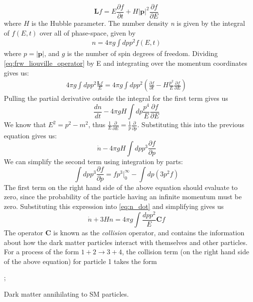 \begin{equation}\label{eq:frw_liouville_operator}
  \mathbf{L}f = E\frac{\partial f}{\partial t} + H|\mathbf{p}|^2 \frac{\partial f}{\partial E}
\end{equation}
where $H$ is the Hubble parameter. The number density \emph{n} is given by the integral of $f(E,t)$ over all of phase-space, given by
\begin{align}
  n = 4\pi g\int dp p^2 f(E,t)
\end{align}
where $p = |\mathbf{p}|$, and $g$ is the number of spin degrees of freedom.
Dividing \autoref{eq:frw_liouville_operator} by E and integrating over the momentum coordinates gives us:
\begin{align}
  4\pi g\int dp p^2 \frac{\mathbf{L}f}{E} = 4\pi g\int dp p^2 \left(\frac{\partial f}{\partial t}- H\frac{p^2}{E}\frac{\partial f}{\partial E}\right)
\end{align}
Pulling the partial derivative outside the integral for the first term gives us
\begin{equation}
  \frac{dn}{dt} - 4\pi gH\int dp\frac{p^4}{E}\frac{\partial f}{\partial E}
\end{equation}
We know that $E^2 = p^2 - m^2$, thus $\frac{1}{E}\frac{\partial}{\partial E} = \frac{1}{p}\frac{\partial}{\partial p}$. Substituting this into the previous equation gives us:
\begin{equation}\label{eq:n_dot}
  \dot{n} - 4\pi gH\int dp p^3 \frac{\partial f}{\partial p}
\end{equation}
We can simplify the second term using integration by parts:
\begin{equation}
  \int dp p^3\frac{\partial f}{\partial p} = fp^3|_{0}^\infty - \int dp (3p^2 f)
\end{equation}
The first term on the right hand side of the above equation should evaluate to zero, since the probability of the particle having an infinite momentum must be zero. Substituting this expression into \autoref{eq:n_dot} and simplifying gives us
\begin{equation}\label{eq:simplified_n_density}
  \dot{n}+3Hn = 4\pi g\int \frac{dpp^2}{E}\mathbf{C}f
\end{equation}
The operator \textbf{C} is known as the \emph{collision} operator, and contains the information about how the dark matter particles interact with themselves and other particles. For a process of the form $1+2\rightarrow 3+4$, the collision term (on the right hand side of the above equation) for particle 1 takes the form  
\begin{marginfigure}
  ;
  \label{fig:dm_annihilation}
  \caption{Dark matter annihilating to SM particles.}
\end{marginfigure}
